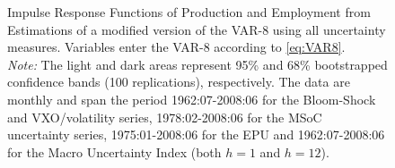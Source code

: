 \documentclass[a4paper,11pt,listof=nochaptergap,oneside,pointednumbers,bibtotoc,bigheadings,liststotoc]{scrbook}
\theoremstyle{mysatz}
\theoremstyle{mydefinition}
\theoremstyle{mybemerkung}
\begin{document}
\begin{figure}[!h]
   \centering
   \setlength\fboxsep{0pt}
   \setlength\fboxrule{0pt}
      \caption[Impulse Response Functions of Production and Employment from Estimations of a modified version of the VAR-8 following \citet{bloom:09} using all uncertainty measures.]{Impulse Response Functions of Production and Employment from Estimations of a modified version of the VAR-8 \citet{bloom:09} using all uncertainty measures. Variables enter the VAR-8 according to \ref{eq:VAR8}.\\
       \textit{Note:} The light and dark areas represent 95\% and 68\% bootstrapped confidence bands (100 replications), respectively. The data are monthly and span the period 1962:07-2008:06 for the Bloom-Shock and VXO/volatility series, 1978:02-2008:06 for the MSoC uncertainty series, 1975:01-2008:06 for the EPU and 1962:07-2008:06 for the Macro Uncertainty Index (both $h=1$ and $h=12$).}   \label{fig:VAR8_NoHP_until2008}
\end{figure}
\end{document}
